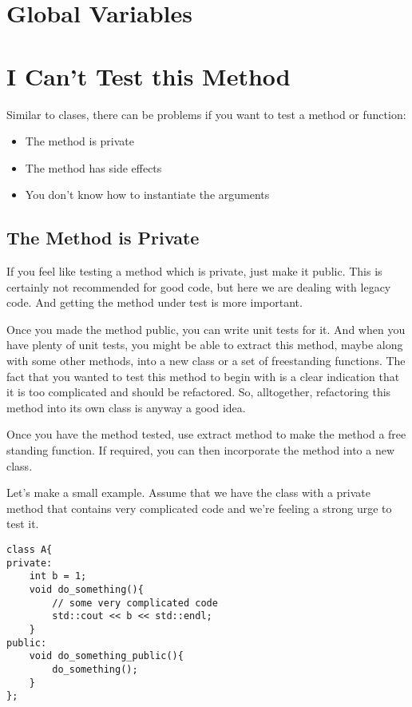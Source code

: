\section{Global Variables}



\section{I Can't Test this Method}

Similar to clases, there can be problems if you want to test a method or function:

\begin{itemize}
\item The method is private
\item The method has side effects
\item You don't know how to instantiate the arguments
\end{itemize}

\subsection{The Method is Private}

If you feel like testing a method which is private, just make it public. This is certainly not recommended for good code, but here we are dealing with legacy code. And getting the method under test is more important.

Once you made the method public, you can write unit tests for it. And when you have plenty of unit tests, you might be able to extract this method, maybe along with some other methods, into a new class or a set of freestanding functions. The fact that you wanted to test this method to begin with is a clear indication that it is too complicated and should be refactored. So, alltogether, refactoring this method into its own class is anyway a good idea.

Once you have the method tested, use extract method to make the method a free standing function. If required, you can then incorporate the method into a new class.

Let's make a small example. Assume that we have the class  with a private method  that contains very complicated code and we're feeling a strong urge to test it.

\begin{programcode}{}
\begin{verbatim}
class A{
private:
    int b = 1;
    void do_something(){
        // some very complicated code
        std::cout << b << std::endl;
    }
public:
    void do_something_public(){
        do_something();
    }
};
\end{verbatim}
\end{programcode}

